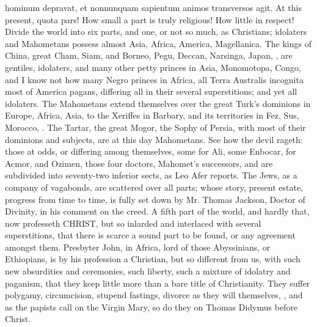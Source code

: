 {hominum depravat, et nonnunquam sapientum animos transversos agit. At
this present, quota pars! How small a part is truly religious! How
little in respect! Divide the world into six parts, and one, or not so
much, as Christians; idolaters and Mahometans possess almost Asia,
Africa, America, Magellanica. The kings of China, great Cham, Siam, and
Borneo, Pegu, Deccan, Narsinga, Japan, \etc{}, are gentiles, idolaters,
and many other petty princes in Asia, Monomotopa, Congo, and I know not
how many Negro princes in Africa, all Terra Australis incognita most of
America pagans, differing all in their several superstitions; and yet
all idolaters. The Mahometans extend themselves over the great Turk's
dominions in Europe, Africa, Asia, to the Xeriffes in Barbary, and its
territories in Fez, Sus, Morocco, \etc{}. The Tartar, the great Mogor, the
Sophy of Persia, with most of their dominions and subjects, are at this
day Mahometans. See how the devil rageth: those at odds, or differing
among themselves, some for Ali, some Enbocar, for Acmor, and
Ozimen, those four doctors, Mahomet's successors, and are subdivided
into seventy-two inferior sects, as Leo Afer reports. The Jews,
as a company of vagabonds, are scattered over all parts; whose story,
present estate, progress from time to time, is fully set down by
Mr. Thomas Jackson, Doctor of Divinity, in his comment on the
creed. A fifth part of the world, and hardly that, now professeth
\textsc{CHRIST}, but so inlarded and interlaced with several superstitions, that
there is scarce a sound part to be found, or any agreement amongst
them. Presbyter John, in Africa, lord of those Abyssinians, or
Ethiopians, is by his profession a Christian, but so different from us,
with such new absurdities and ceremonies, such liberty, such a mixture
of idolatry and paganism, that they keep little more than a bare
title of Christianity. They suffer polygamy, circumcision, stupend
fastings, divorce as they will themselves, \etc{}, and as the papists call
on the Virgin Mary, so do they on Thomas Didymus before Christ.

}
